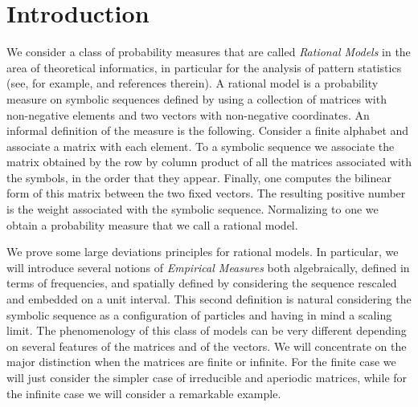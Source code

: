 \documentclass[reqno]{amsart}
\theoremstyle{plain}
\theoremstyle{definition}
\theoremstyle{remark}
\numberwithin{equation}{section}
\numberwithin{theorem}{section}
\newcommand{\<}{\langle}
\renewcommand{\>}{\rangle}
\begin{document}
	\noindent
	
	
	\maketitle
	\thispagestyle{empty}
	
	\section{Introduction}
	
	We consider a class of probability measures that are called {\it Rational Models} in the area of theoretical informatics, in particular for the
	analysis of pattern statistics (see, for example, \cite{B,G2} and references therein). A rational model is a probability measure on symbolic sequences defined by using a collection of matrices with non-negative elements and two vectors with non-negative coordinates. An informal definition of the measure is the following. Consider a finite alphabet and associate a matrix with each element. To a symbolic sequence we associate the matrix obtained by the row by column product of all the matrices associated with the symbols, in the order that they appear. Finally, one computes the bilinear form of this matrix between the two fixed vectors. The resulting positive number is the weight associated with the symbolic sequence. Normalizing to one we obtain a probability measure that we call a rational model.
	
	\smallskip
	
	We prove some large deviations principles for rational models. In particular, we will introduce several notions of {\it Empirical Measures} both algebraically, defined in terms of frequencies, and spatially defined by considering the sequence rescaled and embedded on a unit interval. This second definition is natural considering the symbolic sequence as a configuration of particles and having in mind a scaling limit. The phenomenology of this class of models can be very different depending on several features of the matrices and of the vectors. We will concentrate on the major distinction when the matrices are finite or infinite. For the finite case we will just consider the simpler case of irreducible and aperiodic matrices, while for the infinite case we will consider a remarkable example.
	
\end{document}
